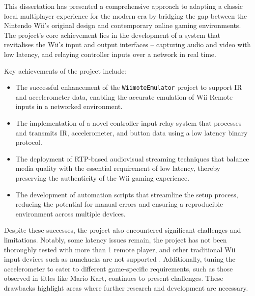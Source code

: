 \label{chapter:conclusion}

This dissertation has presented a comprehensive approach to adapting a classic local multiplayer experience for the modern era by bridging the gap between the Nintendo Wii’s original design and contemporary online gaming environments. The project’s core achievement lies in the development of a system that revitalises the Wii’s input and output interfaces -- capturing audio and video with low latency, and relaying controller inputs over a network in real time.

Key achievements of the project include:
\begin{itemize}
    \item The successful enhancement of the \texttt{WiimoteEmulator} project to support IR and accelerometer data, enabling the accurate emulation of Wii Remote inputs in a networked environment.
    \item The implementation of a novel controller input relay system that processes and transmits IR, accelerometer, and button data using a low latency binary protocol.
    \item The deployment of RTP-based audiovisual streaming techniques that balance media quality with the essential requirement of low latency, thereby preserving the authenticity of the Wii gaming experience.
    \item The development of automation scripts that streamline the setup process, reducing the potential for manual errors and ensuring a reproducible environment across multiple devices.
\end{itemize}

Despite these successes, the project also encountered significant challenges and limitations. Notably, some latency issues remain, the project has not been thoroughly tested with more than 1 remote player, and other traditional Wii input devices such as nunchucks are not supported . Additionally, tuning the accelerometer to cater to different game-specific requirements, such as those observed in titles like Mario Kart, continues to present challenges. These drawbacks highlight areas where further research and development are necessary.

